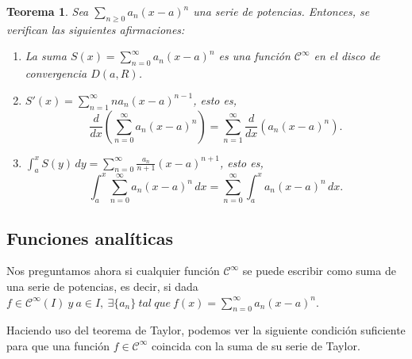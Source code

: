 \documentclass[11pt, a4paper]{article}
\theoremstyle{theorem-style}
\newtheorem{nth}{Teorema}[section]
\theoremstyle{definition-style}
\theoremstyle{remark-style}
\theoremstyle{example-style}
\newenvironment{nlist}
{\begin{enumerate}
    \renewcommand\labelenumi{(\emph{\roman{enumi})}}}
  {\end{enumerate}}
\begin{document}
\begin{nth} \label{14}
  Sea $\displaystyle\sum_{n\geq 0} a_n (x-a)^n$ una serie de potencias. Entonces, se verifican las siguientes afirmaciones:	
  \begin{nlist}
  \item La suma $S(x)=\displaystyle\sum_{n= 0}^\infty a_n (x-a)^n$ es una función $\mathcal{C}^\infty$ en el disco de convergencia $D(a,R)$.
  \item $S'(x)= \displaystyle\sum_{n= 1}^\infty n a_n (x-a)^{n-1}$, esto es,
    \[
      \displaystyle\frac{d}{dx} \left( \sum_{n= 0}^\infty a_n (x-a)^n \right) =  \sum_{n= 1}^\infty \frac{d}{dx} \left( a_n (x-a)^n \right) .
    \]
  \item 
    $\displaystyle \int_a^x S(y)\, dy =   \sum_{n= 0}^\infty \frac{a_n}{n+1} (x-a)^{n+1}$, esto es,
    \[
      \int_a^x  \sum_{n= 0}^\infty a_n (x-a)^n \, dx 
      =  \sum_{n= 0}^\infty \int_a^x a_n (x-a)^n \, dx.
    \]
  \end{nlist}

\end{nth}



\subsection{Funciones analíticas}

Nos preguntamos ahora si cualquier función $\mathcal{C}^{\infty}$ se puede escribir como suma de una serie de potencias, es decir, si dada $f \in \mathcal{C}^{\infty}(I)\ y\ a \in I, \ \exists \{a_n\}\ tal\ que\ f(x) = \sum_{n=0}^{\infty}a_n(x-a)^n$.


Haciendo uso del teorema de Taylor, podemos ver la siguiente condici\'on suficiente para que una funci\'on $f\in \mathcal{C}^\infty$ coincida con la suma de su serie de Taylor.
\end{document}
